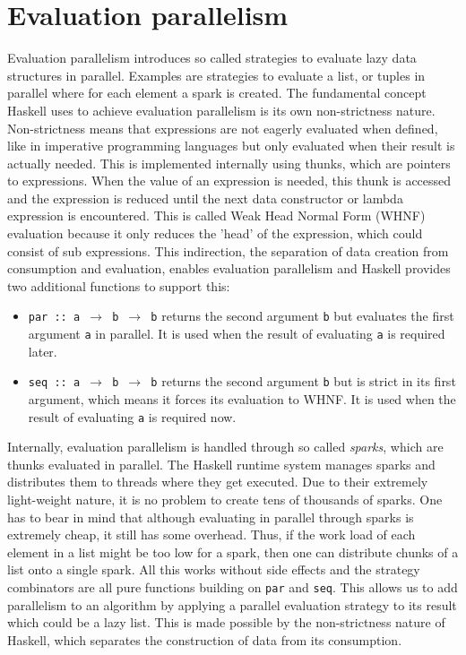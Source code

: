 \section{Evaluation parallelism}
Evaluation parallelism introduces so called strategies to evaluate lazy data structures in parallel. Examples are strategies to evaluate a list, or tuples in parallel where for each element a spark is created. The fundamental concept Haskell uses to achieve evaluation parallelism is its own non-strictness nature. Non-strictness means that expressions are not eagerly evaluated when defined, like in imperative programming languages but only evaluated when their result is actually needed. This is implemented internally using thunks, which are pointers to expressions. When the value of an expression is needed, this thunk is accessed and the expression is reduced until the next data constructor or lambda expression is encountered. This is called Weak Head Normal Form (WHNF) evaluation because it only reduces the 'head' of the expression, which could consist of sub expressions. This indirection, the separation of data creation from consumption and evaluation, enables evaluation parallelism and Haskell provides two additional functions to support this:

\begin{itemize}
	\item \texttt{par :: a $\rightarrow$ b $\rightarrow$ b} returns the second argument \texttt{b} but evaluates the first argument \texttt{a} in parallel. It is used when the result of evaluating \texttt{a} is required later.
	
	\item \texttt{seq :: a $\rightarrow$ b $\rightarrow$ b} returns the second argument \texttt{b} but is strict in its first argument, which means it forces its evaluation to WHNF. It is used when the result of evaluating \texttt{a} is required now.
\end{itemize}

Internally, evaluation parallelism is handled through so called \textit{sparks}, which are thunks evaluated in parallel. The Haskell runtime system manages sparks and distributes them to threads where they get executed. Due to their extremely light-weight nature, it is no problem to create tens of thousands of sparks. One has to bear in mind that although evaluating in parallel through sparks is extremely cheap, it still has some overhead. Thus, if the work load of each element in a list might be too low for a spark, then one can distribute chunks of a list onto a single spark.
All this works without side effects and the strategy combinators are all pure functions building on \texttt{par} and \texttt{seq}. This allows us to add parallelism to an algorithm by applying a parallel evaluation strategy to its result which could be a lazy list. This is made possible by the non-strictness nature of Haskell, which separates the construction of data from its consumption.

